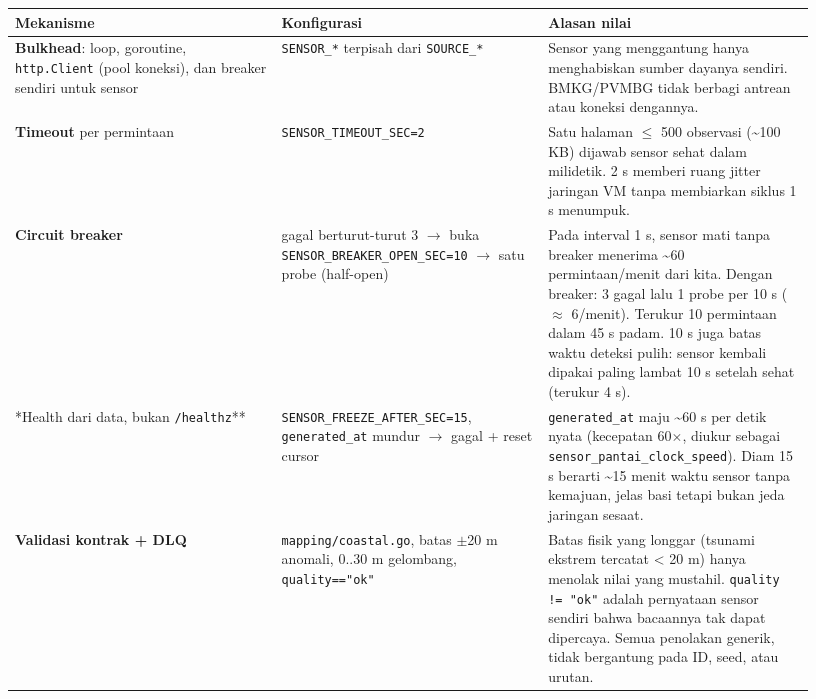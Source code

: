 {\small
\begin{longtable}{@{}>{\raggedright\arraybackslash}p{0.311\linewidth}>{\raggedright\arraybackslash}p{0.311\linewidth}>{\raggedright\arraybackslash}p{0.311\linewidth}@{}}
\toprule
\textbf{Mekanisme} & \textbf{Konfigurasi} & \textbf{Alasan nilai} \\
\midrule
\endhead
\textbf{Bulkhead}: loop, goroutine, \texttt{http.\allowbreak{}Client} (pool koneksi), dan breaker sendiri untuk sensor & \texttt{SENSOR\_\allowbreak{}*} terpisah dari \texttt{SOURCE\_\allowbreak{}*} & Sensor yang menggantung hanya menghabiskan sumber dayanya sendiri. BMKG/PVMBG tidak berbagi antrean atau koneksi dengannya. \\
\textbf{Timeout} per permintaan & \texttt{SENSOR\_\allowbreak{}TIMEOUT\_\allowbreak{}SEC=\allowbreak{}2} & Satu halaman $\le$ 500 observasi (\textasciitilde{}100 KB) dijawab sensor sehat dalam milidetik. 2 s memberi ruang jitter jaringan VM tanpa membiarkan siklus 1 s menumpuk. \\
\textbf{Circuit breaker} & gagal berturut-turut 3 $\rightarrow$ buka \texttt{SENSOR\_\allowbreak{}BREAKER\_\allowbreak{}OPEN\_\allowbreak{}SEC=\allowbreak{}10} $\rightarrow$ satu probe (half-open) & Pada interval 1 s, sensor mati tanpa breaker menerima \textasciitilde{}60 permintaan/menit dari kita. Dengan breaker: 3 gagal lalu 1 probe per 10 s ($\approx$ 6/menit). Terukur 10 permintaan dalam 45 s padam. 10 s juga batas waktu deteksi pulih: sensor kembali dipakai paling lambat 10 s setelah sehat (terukur 4 s). \\
**Health dari data, bukan \texttt{/\allowbreak{}healthz}** & \texttt{SENSOR\_\allowbreak{}FREEZE\_\allowbreak{}AFTER\_\allowbreak{}SEC=\allowbreak{}15}, \texttt{generated\_\allowbreak{}at} mundur $\rightarrow$ gagal + reset cursor & \texttt{generated\_\allowbreak{}at} maju \textasciitilde{}60 s per detik nyata (kecepatan 60$\times$, diukur sebagai \texttt{sensor\_\allowbreak{}pantai\_\allowbreak{}clock\_\allowbreak{}speed}). Diam 15 s berarti \textasciitilde{}15 menit waktu sensor tanpa kemajuan, jelas basi tetapi bukan jeda jaringan sesaat. \\
\textbf{Validasi kontrak + DLQ} & \texttt{mapping/\allowbreak{}coastal.\allowbreak{}go}, batas $\pm$20 m anomali, 0..30 m gelombang, \texttt{quality=\allowbreak{}=\allowbreak{}"ok"} & Batas fisik yang longgar (tsunami ekstrem tercatat < 20 m) hanya menolak nilai yang mustahil. \texttt{quality !=\allowbreak{} "ok"} adalah pernyataan sensor sendiri bahwa bacaannya tak dapat dipercaya. Semua penolakan generik, tidak bergantung pada ID, seed, atau urutan. \\

\end{longtable}}
